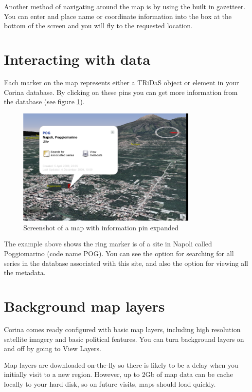Another method of navigating around the map is by using the built in gazetteer. You can enter and place name or coordinate information into the box at the bottom of the screen and you will fly to the requested location. 


\section{Interacting with data}

Each marker on the map represents either a TRiDaS object or element in your Corina database. By clicking on these pins you can get more information from the database (see figure \ref{fig:mappin}).

\begin{figure}[hbtp]
  \label{fig:mappin}
  \centering
    \includegraphics[width=0.8\textwidth]{Images/mappinexample.png}
    \caption{Screenshot of a map with information pin expanded}
\end{figure}

The example above shows the ring marker is of a site in Napoli called Poggiomarino (code name POG). You can see the option for searching for all series in the database associated with this site, and also the option for viewing all the metadata. 

\section{Background map layers}

Corina comes ready configured with basic map layers, including high resolution satellite imagery and basic political features. You can turn background layers on and off by going to View \MVRightarrow Layers.

Map layers are downloaded on-the-fly so there is likely to be a delay when you initially visit to a new region. However, up to 2Gb of map data can be cache locally to your hard disk, so on future visits, maps should load quickly.

